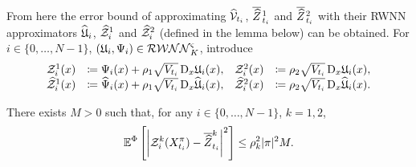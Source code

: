 From here the error bound of approximating $\widehat{\mathcal{V}}_{t_i}$, $\overline{\widehat{Z}}\kern0.1em^{1}_{t_{i}}$ and $\overline{\widehat{Z}}\kern0.1em^{2}_{t_{i}}$ with their RWNN approximators $\widehat{\mathfrak{U}}_i$, $\widehat{\mathcal{Z}}^1_{i}$ and $\widehat{\mathcal{Z}}^2_{i}$ 
(defined in the lemma below)
can be obtained.
For $i\in\{0,\dots,N-1\}$, $(\mathfrak{U}_i, \Psi_i)\in\mathcal{RWNN}^{\varsigma}_K$, 
introduce
\begin{equation*}
\begin{array}{rlrl}
\mathcal{Z}^1_{i}(x) &\coloneqq \Psi_i(x)+\rho_1\sqrt{V_{t_i}}\,\mathrm{D}_{x}\mathfrak{U}_i(x), & 
\mathcal{Z}^2_{i}(x) &\coloneqq \rho_2\sqrt{V_{t_i}}\,\mathrm{D}_{x}\mathfrak{U}_i(x),\\
\widehat{\mathcal{Z}}^1_{i}(x) &\coloneqq \widehat\Psi_i(x)+\rho_1\sqrt{V_{t_i}}\,\mathrm{D}_{x}\widehat{\mathfrak{U}}_i(x), & 
\widehat{\mathcal{Z}}^2_{i}(x) &\coloneqq \rho_2\sqrt{V_{t_i}}\,\mathrm{D}_{x}\widehat{\mathfrak{U}}_i(x).
\end{array}
\end{equation*}

\begin{lemma}\label{lem:approxError}
There exists $M>0$ such that,
for any $i\in\{0,\dots,N-1\}$, $k=1,2$,
$$
\mathbb{E}^\Phi\left[
\left|\mathcal{Z}_i^k(X^\pi_{t_i}) - \overline{\widehat{Z}}^{k}_{t_{i}}\right|^2\right] \leq\rho_k^2|\pi|^2 M.
$$
\end{lemma}


